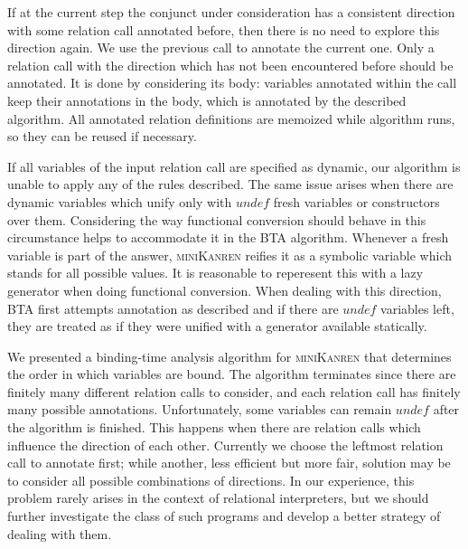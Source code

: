 \documentclass[submission,copyright,creativecommons]{eptcs}
\newcommand{\miniKanren}{\textsc{miniKanren}}
\newcommand\undef{unde\!f}
\begin{document}
If at the current step the conjunct under consideration has a consistent direction with some relation call annotated before, then there is no need to explore this direction again.
We use the previous call to annotate the current one.
Only a relation call with the direction which has not been encountered before should be annotated.
It is done by considering its body: variables annotated within the call keep their annotations in the body, which is annotated by the described algorithm.
All annotated relation definitions are memoized while algorithm runs, so they can be reused if necessary.

If all variables of the input relation call are specified as dynamic, our algorithm is unable to apply any of the rules described.
The same issue arises when there are dynamic variables which unify only with $\undef{}$ fresh variables or constructors over them.
Considering the way functional conversion should behave in this circumstance helps to accommodate it in the BTA algorithm.
Whenever a fresh variable is part of the answer, \miniKanren{} reifies it as a symbolic variable which stands for all possible values.
It is reasonable to reperesent this with a lazy generator when doing functional conversion.
When dealing with this direction, BTA first attempts annotation as described and if there are $\undef{}$ variables left, they are treated as if they were unified with a generator available statically.


We presented a binding-time analysis algorithm for \miniKanren{} that determines the order in which variables are bound.
The algorithm terminates since there are finitely many different relation calls to consider, and each relation call has finitely many possible annotations.
Unfortunately, some variables can remain $\undef{}$ after the algorithm is finished.
This happens when there are relation calls which influence the direction of each other.
Currently we choose the leftmost relation call to annotate first; while another, less efficient but more fair, solution may be to consider all possible combinations of directions.
In our experience, this problem rarely arises in the context of relational interpreters, but we should further investigate the class of such programs and develop a better strategy of dealing with them.



\nocite{*}


\end{document}
